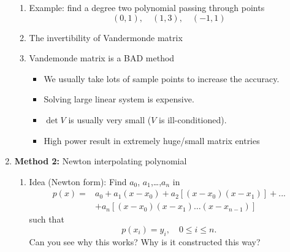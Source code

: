 \documentclass{article}
\newtheorem{thm}{Theorem}[section]
\theoremstyle{remark}
\begin{document}
\begin{enumerate}
\begin{enumerate}
\item Example: find a degree two polynomial passing through points
$$
(0,1), \quad (1,3),\quad (-1,1)
$$


\item The invertibility of Vandermonde matrix

\item Vandemonde matrix is a BAD method
\begin{itemize}
\item We usually take lots of sample points to increase the accuracy.
\item Solving large linear system is expensive.
\item $\det V$ is usually very small ($V$ is ill-conditioned).
\item High power result in extremely huge/small matrix entries
\end{itemize}
\end{enumerate}


\item {\bf Method 2:} Newton interpolating polynomial
\begin{enumerate}
\item Idea (Newton form): Find $a_0$, $a_1$,\dots,$a_n$ in
\begin{equation}\nonumber
\begin{split}
p(x) = &a_0 + a_1(x-x_0) + a_2[(x-x_0)(x-x_1)] + ... \\
& + a_n[(x-x_0)(x-x_1)\dots(x-x_{n-1})]
\end{split}
\end{equation}
such that
$$
p(x_i) = y_i,\quad 0\leq i\leq n.
$$
Can you see why this works? Why is it constructed this way?


\end{enumerate}
\end{enumerate}
\end{document}
